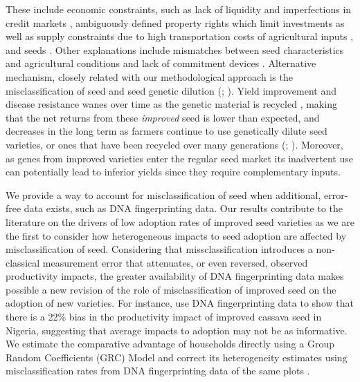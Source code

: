 \documentclass[11pt]{article}
\begin{document}

These include economic constraints, such as lack of liquidity and imperfections in credit markets \citep{Croppenstedt2003-pq; Carter2014-fm }, ambiguously defined property rights which limit investments \citep{Place2000-el} as well as supply constraints due to high transportation costs of agricultural inputs \citep{Byerlee2013-qk}, and seeds \citep{Bird2020-nt}. Other explanations include mismatches between seed characteristics and agricultural conditions \citep{Munshi2004-og} and lack of commitment devices \citep{Duflo2009-iv}.  
Alternative mechanism, closely related with our methodological approach is the misclassification of seed and seed genetic dilution (\citealt{wossen2022misperceiving}; \citealt{kosmowski2019varietal}). Yield improvement and disease resistance wanes over time as the genetic material is recycled \citep{Abate2015-rj}, making that the net returns from these \textit{improved} seed is lower than expected, and decreases in the long term as farmers continue to use genetically dilute seed varieties, or ones that have been recycled over many generations (\citealt{euler2022because}; \citealt{wossen2019estimating}). Moreover, as genes from improved varieties enter the regular seed market its inadvertent use can potentially lead to inferior yields since they require complementary inputs.




We provide a way to account for misclassification of seed when additional, error-free data exists, such as DNA fingerprinting data. Our results contribute to the literature on the drivers of low adoption rates of improved seed varieties as we are the first to consider how heterogeneous impacts to seed adoption are affected by misclassification of seed. Considering that  missclassification introduces a non-classical measurement error that attenuates, or even reversed,  observed productivity impacts, the greater availability of DNA fingerprinting data makes possible a new revision of the role of misclassification of improved seed on the adoption of new varieties. For instance, \cite{wossen2019estimating} use DNA fingerprinting data to show that there is a 22\% bias in the productivity impact of improved cassava seed in Nigeria, suggesting that average impacts to adoption may not be as informative.  We estimate the comparative advantage of households directly using a Group Random Coefficients (GRC) Model and correct its heterogeneity estimates using misclassification rates from DNA fingerprinting data of the same plots \citep{Suri2011-oi, Tjernstrom_Emilia_Dalia_Ghanem_Oscar_Barriga_Cabanillas_Travis_J_Lybbert_Jeffrey_D_Michler_and_Aleksandr_Michuda2020-bc}. 
\end{document}

